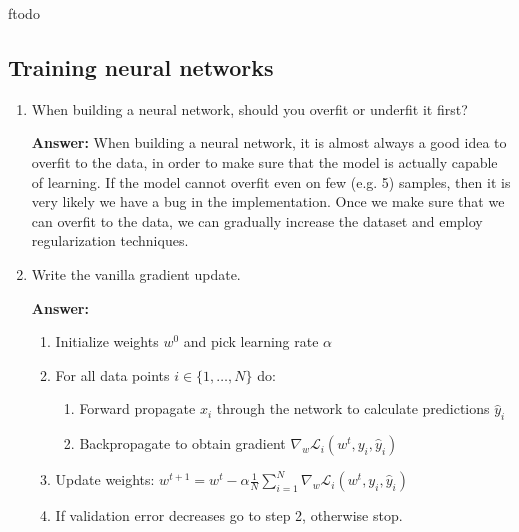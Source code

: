ƒtodo\documentclass{article}
\newenvironment{QandA}{\begin{enumerate}[label=\arabic*.]}{\end{enumerate}}
\newenvironment{answer}{\par\normalfont \textbf{Answer:}}{}
\begin{document}
\subsection{Training neural networks}
\begin{QandA}
    \item When building a neural network, should you overfit or underfit it first?
    \begin{answer}
        When building a neural network, it is almost always a good idea to overfit to the data, in order to make sure that the model is actually capable of learning. If the model cannot overfit even on few (e.g. 5) samples, then it is very likely we have a bug in the implementation. Once we make sure that we can overfit to the data, we can gradually increase the dataset and employ regularization techniques. 
    \end{answer}

    \item Write the vanilla gradient update.
    \begin{answer}
        \begin{enumerate}[label=\arabic*.]
            \item Initialize weights $w^0$ and pick learning rate $\alpha$
            \item For all data points $i \in \{1, \ldots, N\}$ do:
            \begin{enumerate}[label=2.\arabic*.]
                \item Forward propagate $x_i$ through the network to calculate predictions $\hat{y}_i$
                \item Backpropagate to obtain gradient $\nabla_w \mathcal{L}_i (w^t, y_i, \hat{y}_i)$
            \end{enumerate}
            \item Update weights: $w^{t+1} = w^t - \alpha \frac{1}{N}\sum_{i=1}^N \nabla_w \mathcal{L}_i(w^t, y_i, \hat{y}_i)$
            \item If validation error decreases go to step 2, otherwise stop.
        \end{enumerate}
    \end{answer}


\end{QandA}
\end{document}
